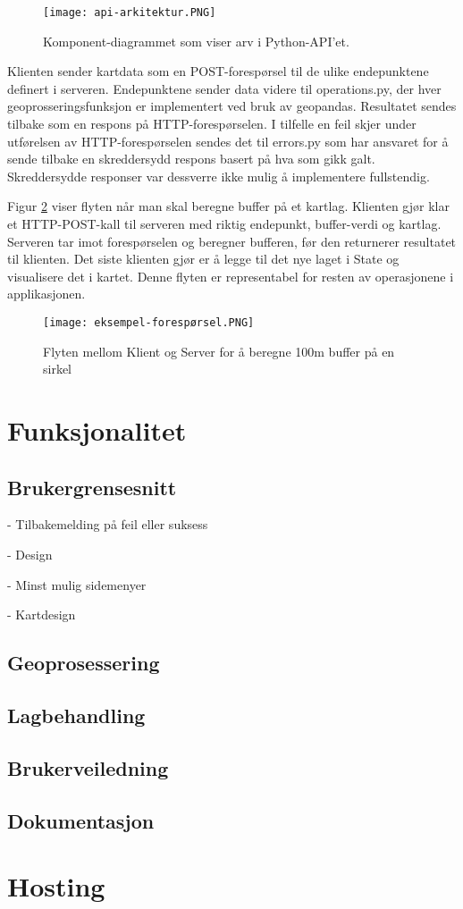 \begin{figure}[h]
    \center
    \texttt{[image: api-arkitektur.PNG]}
    \caption{Komponent-diagrammet som viser arv i Python-API'et.}
    \label{fig:api-arktitektur}
\end{figure}

Klienten sender kartdata som en POST-forespørsel til de ulike endepunktene definert i serveren. Endepunktene sender data videre til operations.py, der hver geoprosseringsfunksjon er implementert ved bruk av geopandas. Resultatet sendes tilbake som en respons på HTTP-forespørselen. I tilfelle en feil skjer under utførelsen av HTTP-forespørselen sendes det til errors.py som har ansvaret for å sende tilbake en skreddersydd respons basert på hva som gikk galt. Skreddersydde responser var dessverre ikke mulig å implementere fullstendig. 

Figur \ref{fig:forespørsel} viser flyten når man skal beregne buffer på et kartlag. Klienten gjør klar et HTTP-POST-kall til serveren med riktig endepunkt, buffer-verdi og kartlag. Serveren tar imot forespørselen og beregner bufferen, før den returnerer resultatet til klienten. Det siste klienten gjør er å legge til det nye laget i State og visualisere det i kartet. Denne flyten er representabel for resten av operasjonene i applikasjonen.  

\begin{figure}[h]
    \center
    \texttt{[image: eksempel-forespørsel.PNG]}
    \caption{Flyten mellom Klient og Server for å beregne 100m buffer på en sirkel}
    \label{fig:forespørsel}
\end{figure}

\section{Funksjonalitet}



\subsection{Brukergrensesnitt}

- Tilbakemelding på feil eller suksess

- Design

- Minst mulig sidemenyer

- Kartdesign

\subsection{Geoprosessering}

\subsection{Lagbehandling}

\subsection{Brukerveiledning}

\subsection{Dokumentasjon}

\section{Hosting}
\label{sec:hosting}
